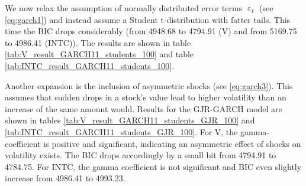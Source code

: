 \begin{table}[h!]
    \centering
    
    \caption{}
    \label{tab:INTC_result_GARCH11_100}
\end{table}{}

We now relax the assumption of normally distributed error terms $\upepsilon_t$ (see \ref{eq:garch1}) and instead assume a Student t-distribution with fatter tails. This time the BIC drops considerably (from 4948.68 to 4794.91 (V) and from 5169.75 to 4986.41 (INTC)). The results are shown in table \ref{tab:V_result_GARCH11_students_100} and table \ref{tab:INTC_result_GARCH11_students_100}. 

\begin{table}[h]
    \centering
    
    \caption{}
    \label{tab:V_result_GARCH11_students_100}
\end{table}{}

\begin{table}[h!]
    \centering
    
    \caption{}
    \label{tab:INTC_result_GARCH11_students_100}
\end{table}{}

Another expansion is the inclusion of asymmetric shocks (see \ref{eq:garch3}). This assumes that sudden drops in a stock's value lead to higher volatility than an increase of the same amount would. Results for the GJR-GARCH model are shown in tables \ref{tab:V_result_GARCH11_students_GJR_100} and \ref{tab:INTC_result_GARCH11_students_GJR_100}. For V, the gamma-coefficient is positive and significant, indicating an asymmetric effect of shocks on volatility exists. The BIC drops accordingly by a small bit from 4794.91 to 4784.75. For INTC, the gamma coefficient is not significant and BIC even slightly increase from 4986.41 to 4993.23.

\begin{table}[h]
    \centering
    
    \caption{}
    \label{tab:V_result_GARCH11_students_GJR_100}
\end{table}{}

\begin{table}[h!]
    \centering
    
    \caption{}
    \label{tab:INTC_result_GARCH11_students_GJR_100}
\end{table}{}

